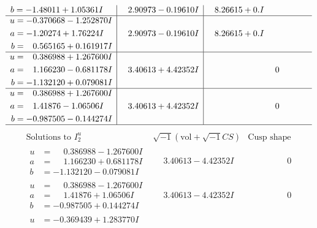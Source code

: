 \documentclass[1p]{elsarticle_modified}
\theoremstyle{definition}
\newcommand{\I}{\sqrt{-1}}
\begin{document}
$$\begin{array}{c|c|c}
\begin{aligned}
b &= -1.48011 + 1.05361 I\end{aligned}
 & \phantom{-}2.90973 - 0.19610 I & \phantom{-}8.26615 + 0. I\phantom{ +0.000000I} \\ \hline\begin{aligned}
u &= -0.370668 - 1.252870 I \\
a &= -1.20274 + 1.76224 I \\
b &= \phantom{-}0.565165 + 0.161917 I\end{aligned}
 & \phantom{-}2.90973 - 0.19610 I & \phantom{-}8.26615 + 0. I\phantom{ +0.000000I} \\ \hline\begin{aligned}
u &= \phantom{-}0.386988 + 1.267600 I \\
a &= \phantom{-}1.166230 - 0.681178 I \\
b &= -1.132120 + 0.079081 I\end{aligned}
 & \phantom{-}3.40613 + 4.42352 I & \phantom{-0.000000 } 0 \\ \hline\begin{aligned}
u &= \phantom{-}0.386988 + 1.267600 I \\
a &= \phantom{-}1.41876 - 1.06506 I \\
b &= -0.987505 - 0.144274 I\end{aligned}
 & \phantom{-}3.40613 + 4.42352 I & \phantom{-0.000000 } 0\\
 \hline 
 \end{array}$$\newpage$$\begin{array}{c|c|c}  
\text{Solutions to }I^u_{2}& \I (\text{vol} + \sqrt{-1}CS) & \text{Cusp shape}\\
 \hline 
\begin{aligned}
u &= \phantom{-}0.386988 - 1.267600 I \\
a &= \phantom{-}1.166230 + 0.681178 I \\
b &= -1.132120 - 0.079081 I\end{aligned}
 & \phantom{-}3.40613 - 4.42352 I & \phantom{-0.000000 } 0 \\ \hline\begin{aligned}
u &= \phantom{-}0.386988 - 1.267600 I \\
a &= \phantom{-}1.41876 + 1.06506 I \\
b &= -0.987505 + 0.144274 I\end{aligned}
 & \phantom{-}3.40613 - 4.42352 I & \phantom{-0.000000 } 0 \\ \hline\begin{aligned}
u &= -0.369439 + 1.283770 I \\

\end{aligned}
\end{array}$$
\end{document}
